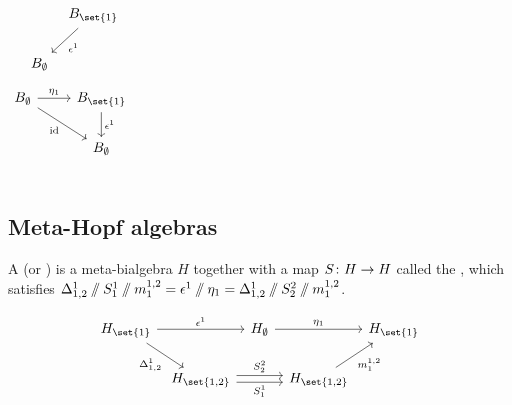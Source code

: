 \documentclass{beamer}
\theoremstyle{theorem}
\begin{document}
\begin{frame}
\begin{columns}
\begin{equation*}
\begin{tikzcd}[ampersand replacement=\&,column sep=tiny]
                \&\&B_{\set{1}}
                        \dlar["\counit^{1}"] \\
                \&B_{\emptyset}
        \end{tikzcd}
        \end{equation*}
        \hline
        \begin{equation*}\label{eq:cd_unit_counit}
        \begin{tikzcd}[ampersand replacement=\&]
                B_{\emptyset}
                        \rar["\unit_{1}"]
                        \drar["\id"']
                \&B_{\set{1}}
                        \dar["\counit^{1}"] \\
                \&B_{\emptyset}
        \end{tikzcd}
        \end{equation*}
        \end{columns}
\end{frame}

\subsection{Meta-Hopf algebras}

\begin{frame}
        \begin{definition}
        A  (or ) is a
        meta-bialgebra $H$ together with a map $\map {\antipode} {H} {H}$ called
        the , which satisfies
        $\Delta^{1}_{1,2}\mathbin{/\mkern-6mu/} S^1_1 \mathbin{/\mkern-6mu/} m^{1,2}_1 =
        \epsilon^{1}\mathbin{/\mkern-6mu/}\eta_{1} =
        \Delta^{1}_{1,2}\mathbin{/\mkern-6mu/} S^2_2 \mathbin{/\mkern-6mu/} m^{1,2}_1$.
        \end{definition}
        \begin{equation*}
        \begin{tikzcd}[ampersand replacement=\&,column sep=tiny]
                \label{eq:cd_antipode}
                H_{\set{1}}
                        \arrow[rr, "\counit^{1}"] \arrow[rd, "\comult^{1}_{1,2}"']
                \&\& H_{\emptyset}
                        \arrow[rr, "\unit_{1}"]
                \&\& H_{\set{1}} \\
                \& H_{\set{1,2}}
                        \arrow[rr, "\antipode^{2}_{2}", shift left]
                        \arrow[rr, "\antipode^{1}_{1}"', shift right]
                \&\& H_{\set{1,2}} \arrow[ru, "\mult^{1,2}_{1}"']
        \end{tikzcd}
        \end{equation*}
\end{frame}
\end{document}
